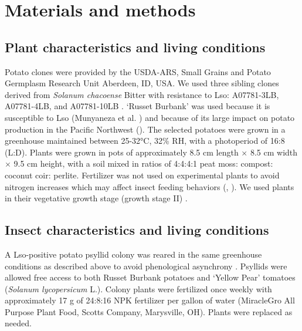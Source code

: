 \documentclass{UIdahoMastersThesis}
\begin{document}
\chapter{Materials and methods}
\label{ch:mms}

\section{Plant characteristics and living conditions}
\label{sec:plants}
Potato clones were provided by the USDA-ARS, Small Grains and Potato Germplasm Research Unit Aberdeen, ID, USA. We used three sibling clones derived from \textit{Solanum chacoense} Bitter with resistance to Lso: A07781-3LB, A07781-4LB, and A07781-10LB \autocite{Rashidi2017}. ‘Russet Burbank’ was used because it is susceptible to Lso (Munyaneza et al. \citeyear{Munyaneza2011}) and because of its large impact on potato production in the Pacific Northwest (\cite{NASSNorthwestRegionalFieldOffice2017}).
The selected potatoes were grown in a greenhouse maintained between 25-32°C, 32\% RH, with a photoperiod of 16:8 (L:D). Plants were grown in pots of approximately 8.5 cm length $\times$ 8.5 cm width $\times$ 9.5 cm height, with a soil mixed in ratios of 4:4:4:1 peat moss: compost: coconut coir: perlite. Fertilizer was not used on experimental plants to avoid nitrogen increases which may affect insect feeding behaviors (\cite{Pfeiffer1983}, \citeyear{Pfeiffer1984}). We used plants in their vegetative growth stage (growth stage II) \autocite{Dwelle2003}.


\section{Insect characteristics and living conditions}
\label{sec:insects}
A Lso-positive potato psyllid colony was reared in the same greenhouse conditions as described above to avoid phenological asynchrony \autocite{Hodkinson2015}.  Psyllids were allowed free access to both Russet Burbank potatoes and ‘Yellow Pear’ tomatoes (\textit{Solanum lycopersicum} L.). Colony plants were fertilized once weekly with approximately 17 g of 24:8:16 NPK fertilizer per gallon of water (MiracleGro\textsuperscript{\textregistered} All Purpose Plant Food, Scotts Company, Marysville, OH). Plants were replaced as needed. 
\end{document}
